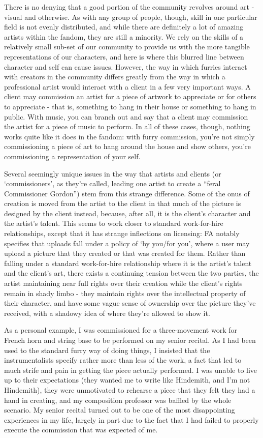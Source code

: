 There is no denying that a good portion of the community revolves around art - visual and otherwise. As with any group of people, though, skill in one particular field is not evenly distributed, and while there are definitely a lot of amazing artists within the fandom, they are still a minority. We rely on the skills of a relatively small sub-set of our community to provide us with the more tangible representations of our characters, and here is where this blurred line between character and self can cause issues. However, the way in which furries interact with creators in the community differs greatly from the way in which a professional artist would interact with a client in a few very important ways. A client may commission an artist for a piece of artwork to appreciate or for others to appreciate - that is, something to hang in their house or something to hang in public. With music, you can branch out and say that a client may commission the artist for a piece of music to perform. In all of these cases, though, nothing works quite like it does in the fandom: with furry commission, you're not simply commissioning a piece of art to hang around the house and show others, you're commissioning a representation of your self.

Several seemingly unique issues in the way that artists and clients (or `commissioners', as they're called, leading one artist to create a ``feral Commissioner Gordon'') stem from this strange difference. Some of the onus of creation is moved from the artist to the client in that much of the picture is designed by the client instead, because, after all, it is the client's character and the artist's talent. This seems to work closer to standard work-for-hire relationships, except that it has strange inflections on licensing: FA notably specifies that uploads fall under a policy of `by you/for you', where a user may upload a picture that they created or that was created for them. Rather than falling under a standard work-for-hire relationship where it is the artist's talent and the client's art, there exists a continuing tension between the two parties, the artist maintaining near full rights over their creation while the client's rights remain in shady limbo - they maintain rights over the intellectual property of their character, and have some vague sense of ownership over the picture they've received, with a shadowy idea of where they're allowed to show it.

As a personal example, I was commissioned for a three-movement work for French horn and string base to be performed on my senior recital. As I had been used to the standard furry way of doing things, I insisted that the instrumentalists specify rather more than less of the work, a fact that led to much strife and pain in getting the piece actually performed. I was unable to live up to their expectations (they wanted me to write like Hindemith, and I'm not Hindemith), they were unmotivated to rehearse a piece that they felt they had a hand in creating, and my composition professor was baffled by the whole scenario. My senior recital turned out to be one of the most disappointing experiences in my life, largely in part due to the fact that I had failed to properly execute the commission that was expected of me.

